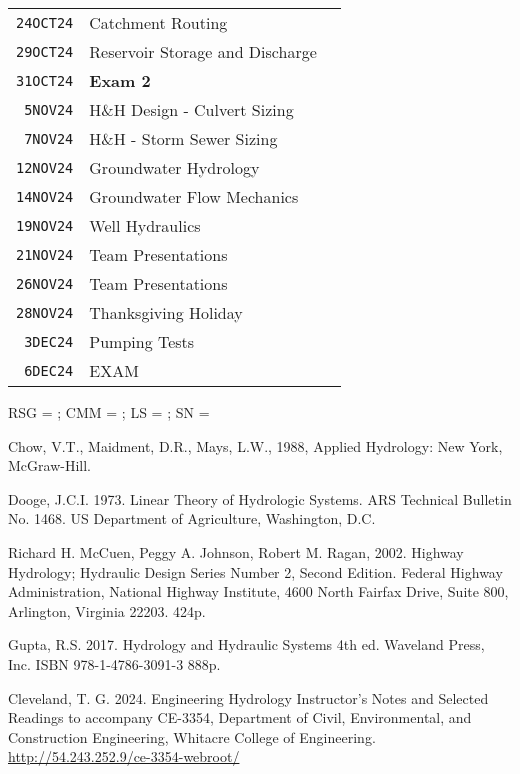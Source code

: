 \documentclass[12pt]{article}
\begin{document}
\begin{table}[ht!]
\begin{tabular}{p{0.5in}p{2.5in}p{3.0in}}
\texttt{24OCT24} & Catchment Routing & \\ %
\texttt{29OCT24} & Reservoir Storage and Discharge & \\ %
\texttt{31OCT24} & \textbf{Exam 2} & \\ %
\texttt{~5NOV24} & H\&H Design - Culvert Sizing &  \\ %
\texttt{~7NOV24} & H\&H - Storm Sewer Sizing &   \\ %
\texttt{12NOV24} & Groundwater Hydrology &  \\ %
\texttt{14NOV24} & Groundwater Flow Mechanics & \\ %
\texttt{19NOV24} & Well Hydraulics &  \\ %
\texttt{21NOV24} & Team Presentations &  \\ %
\texttt{26NOV24} & Team Presentations &  \\ %
\texttt{28NOV24} & Thanksgiving Holiday &    \\ %
\texttt{~3DEC24} & Pumping Tests & \\ %
\texttt{~6DEC24} & EXAM  &  \\ %
\hline
\hline
   \end{tabular}
   \label{tab:fall2013schedule}
\end{table}
RSG = \cite{Gupta2017};
CMM = \cite{CMM1988}; 
LS = \cite{Dooge1973} ;
SN = \cite{Cleveland2024}

\clearpage



\begin{thebibliography}{}

Chow, V.T., Maidment, D.R., Mays, L.W., 1988, Applied Hydrology: New York,
McGraw-Hill.

Dooge, J.C.I. 1973.  Linear Theory of Hydrologic Systems. ARS Technical Bulletin No. 1468.  US Department of Agriculture, Washington, D.C.

Richard H. McCuen, Peggy A. Johnson, Robert M. Ragan, 2002.  Highway Hydrology; Hydraulic Design Series Number 2, Second Edition.  
Federal Highway Administration, National Highway Institute, 4600 North Fairfax Drive, Suite 800, Arlington, Virginia 22203.  424p.

Gupta, R.S. 2017. Hydrology and Hydraulic Systems 4th ed. Waveland Press, Inc. ISBN 978-1-4786-3091-3 888p.

Cleveland, T. G. 2024. Engineering Hydrology Instructor's Notes and Selected Readings to accompany CE-3354, Department of Civil, Environmental, and Construction Engineering, Whitacre College of Engineering. \url{http://54.243.252.9/ce-3354-webroot/}

\end{thebibliography}
\end{document}
